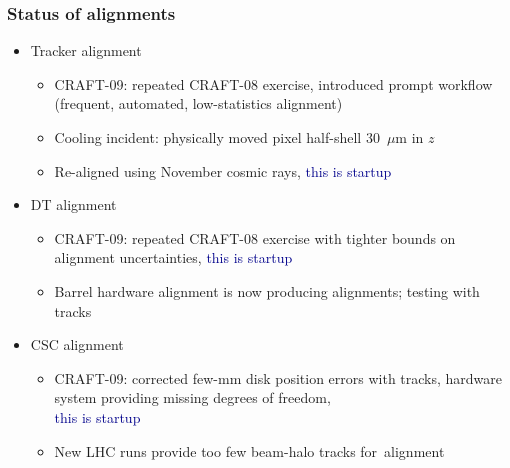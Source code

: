 \documentclass[compress]{beamer}
\begin{document}
\begin{frame}
\frametitle{Status of alignments}
\begin{itemize}\setlength{\itemsep}{0.1 cm}
\item Tracker alignment
\begin{itemize}\setlength{\itemsep}{0.1 cm}
\item CRAFT-09: repeated CRAFT-08 exercise, introduced prompt workflow (frequent, automated, low-statistics alignment)
\item Cooling incident: physically moved pixel half-shell 30~$\mu$m in $z$
\item Re-aligned using November cosmic rays, \textcolor{darkblue}{this is startup}
\end{itemize}

\item DT alignment
\begin{itemize}\setlength{\itemsep}{0.1 cm}
\item CRAFT-09: repeated CRAFT-08 exercise with tighter bounds on alignment uncertainties, \textcolor{darkblue}{this is startup}
\item Barrel hardware alignment is now producing alignments; testing with tracks
\end{itemize}

\item CSC alignment
\begin{itemize}\setlength{\itemsep}{0.1 cm}
\item CRAFT-09: corrected few-mm disk position errors with tracks,
  hardware system providing missing degrees of freedom, \\
  \textcolor{darkblue}{this is startup}
\item New LHC runs provide too few beam-halo tracks \mbox{for alignment\hspace{-1 cm}}
\end{itemize}
\end{itemize}
\end{frame}
\end{document}

